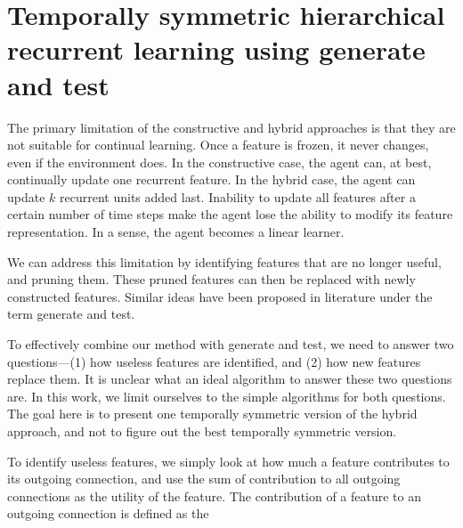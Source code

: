 \documentclass[twoside,11pt]{article}
\newcommand{\etal}{\textit{et al}.}
\begin{document}
\section{Temporally symmetric hierarchical recurrent learning using generate and test}  
The primary limitation of the constructive and hybrid approaches is that they are not suitable for continual learning. Once a feature is frozen, it never changes, even if the environment does. In the constructive case, the agent can, at best, continually update one recurrent feature. In the hybrid case, the agent can update $k$ recurrent units added last. Inability to update all features after a certain number of time steps  make the agent lose the ability to  modify its feature representation. In a sense, the agent becomes a linear learner. 

We can address this limitation by identifying features that are no longer useful, and pruning them. These pruned features can then be replaced with newly constructed features. Similar ideas have been proposed in literature under the term generate and test. 

To effectively combine our method with generate and test, we need to answer two questions---(1) how useless features are identified, and (2) how new features replace them. It is unclear what an ideal algorithm to answer these two questions are. In this work, we limit ourselves to the simple algorithms for both questions. The goal here is to present one temporally symmetric version of the hybrid approach, and not to figure out the best temporally symmetric version. 

To identify useless features, we simply look at how much a feature contributes to its outgoing connection, and use the sum of contribution to all outgoing connections as the utility of the feature. The contribution of a feature to an outgoing connection is defined as the 


\end{document}
